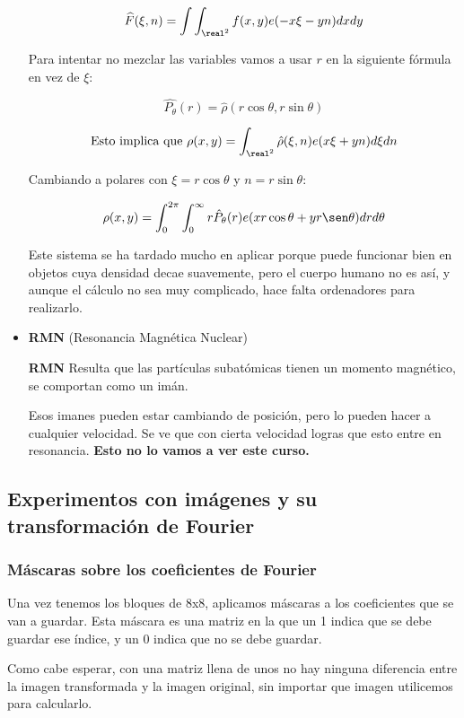 \begin{itemize}
	$$\widehat{F}(\xi , n) = \int \int_{\real^2} f(x,y) e (-x\xi -yn) dxdy$$

	Para intentar no mezclar las variables vamos a usar $r$ en la siguiente fórmula en vez de $\xi$:

	$$\hat{P_{\theta}} (r) = \hat{\rho} (r \cos \theta, r \sin \theta)$$

	$$ \text{Esto implica que } \rho (x,y) = \int_{\real^2} \hat{\rho}(\xi, n) e(x \xi + yn) d\xi dn $$

	Cambiando a polares con $\xi = r \cos \theta$ y $n = r \sin \theta$:

	$$ \rho (x,y) = \int^{2\pi}_{0} \int^{\infty}_{0} r \hat{P}_{\theta} (r) e (x r \cos \theta + y r \sen \theta) dr d\theta $$

	Este sistema se ha tardado mucho en aplicar porque puede funcionar bien en objetos cuya densidad decae suavemente, pero el cuerpo humano no es así, y aunque el cálculo no sea muy complicado, hace falta ordenadores para realizarlo.
	\item \textbf{RMN} (Resonancia Magnética Nuclear)

	\textbf{RMN} Resulta que las partículas subatómicas tienen un momento magnético, se comportan como un imán.

	Esos imanes pueden estar cambiando de posición, pero lo pueden hacer a cualquier velocidad. Se ve que con cierta velocidad logras que esto entre en resonancia. \textbf{Esto no lo vamos a ver este curso.}
\end{itemize}








\subsection{Experimentos con imágenes y su transformación de Fourier}

	\subsubsection{Máscaras sobre los coeficientes de Fourier}

		Una vez tenemos los bloques de 8x8, aplicamos máscaras a los coeficientes que se van a guardar. Esta máscara es una matriz en la que un 1 indica que se debe guardar ese índice, y un 0 indica que no se debe guardar.

		Como cabe esperar, con una matriz llena de unos no hay ninguna diferencia entre la imagen transformada y la imagen original, sin importar que imagen utilicemos para calcularlo.

